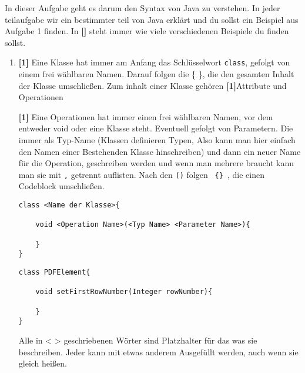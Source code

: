 
In dieser Aufgabe geht es darum den Syntax von Java zu verstehen.
In jeder teilaufgabe wir ein bestimmter teil von Java erklärt und du sollst ein Beispiel aus Aufgabe 1 finden. In \textbf{[]} steht immer wie viele verschiedenen Beispiele du finden sollst.

\begin{enumerate}
    \item \textbf{[1]} Eine Klasse hat immer am Anfang das Schlüsselwort \lstinline{class}, gefolgt von einem frei wählbaren Namen. Darauf folgen die \{ \}, die den gesamten Inhalt der Klasse umschließen.
          Zum inhalt einer Klasse gehören \textbf{[1]}Attribute und Operationen

          \textbf{[1]} Eine Operationen hat immer einen frei wählbaren Namen, vor dem entweder void oder eine Klasse steht. Eventuell gefolgt von Parametern. Die immer als Typ-Name (Klassen definieren Typen, Also kann man hier einfach den Namen einer Bestehenden Klasse hinschreiben) und dann ein neuer Name für die Operation, geschreiben werden und wenn man mehrere braucht kann man sie mit \lstinline{,} getrennt auflisten.
          Nach den \lstinline{()} folgen \texttt{ \{\} }, die einen Codeblock umschließen.

          \begin{lstlisting}[title={\textbf{Klassen Syntax}}]
class <Name der Klasse>{
        
    void <Operation Name>(<Typ Name> <Parameter Name>){
                
    }                    
}
                \end{lstlisting}
          \begin{lstlisting}[title={\textbf{Klassen Beispiel}}]
class PDFElement{
        
    void setFirstRowNumber(Integer rowNumber){
                
    }                    
}
                                    \end{lstlisting}
          Alle in < > geschriebenen Wörter sind Platzhalter für das was sie beschreiben. Jeder kann mit etwas anderem Ausgefüllt werden, auch wenn sie gleich heißen.


\end{enumerate}
